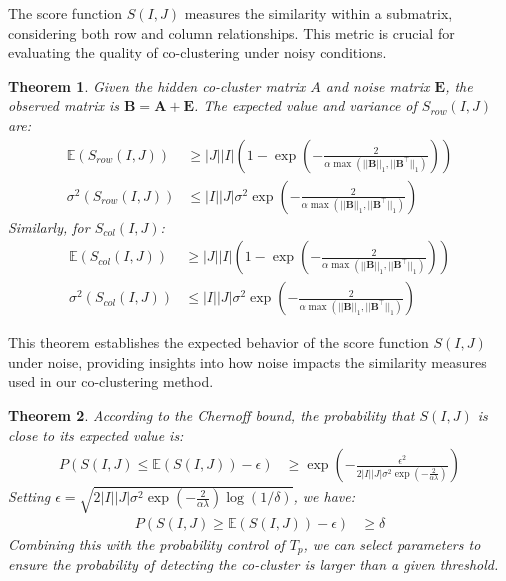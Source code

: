 \documentclass[journal]{IEEEtran}
\newtheorem{theorem}{Theorem}
\begin{document}
The score function $S(I,J)$ measures the similarity within a submatrix, considering both row and column relationships. This metric is crucial for evaluating the quality of co-clustering under noisy conditions.

\begin{theorem}
  \label{thm:expected_score}
  Given the hidden co-cluster matrix $A$ and noise matrix $\mathbf{E}$, the observed matrix is $\mathbf{B} = \mathbf{A} + \mathbf{E}$. The expected value and variance of $S_{row}(I,J)$ are:
  \begin{align*}
    \mathbb{E}(S_{row}(I,J)) & \ge |J||I| \left(1 - \exp(-\frac{2}{\alpha \max(||\mathbf{B}||_1, ||\mathbf{B}^\top||_1)}) \right) \\
    \sigma^2(S_{row}(I,J))   & \le |I||J| \sigma^2 \exp(-\frac{2}{\alpha \max(||\mathbf{B}||_1, ||\mathbf{B}^\top||_1)})
  \end{align*}
  Similarly, for $S_{col}(I,J)$:
  \begin{align*}
    \mathbb{E}(S_{col}(I,J)) & \ge |J||I| \left(1 - \exp(-\frac{2}{\alpha \max(||\mathbf{B}||_1, ||\mathbf{B}^\top||_1)}) \right) \\
    \sigma^2(S_{col}(I,J))   & \le |I||J| \sigma^2 \exp(-\frac{2}{\alpha \max(||\mathbf{B}||_1, ||\mathbf{B}^\top||_1)})
  \end{align*}
\end{theorem}

This theorem establishes the expected behavior of the score function $S(I,J)$ under noise, providing insights into how noise impacts the similarity measures used in our co-clustering method.

\begin{theorem}
  \label{thm:chernoff_bound}
  According to the Chernoff bound, the probability that $S(I,J)$ is close to its expected value is:
  \begin{align*}
    P(S(I,J) \le \mathbb{E}(S(I,J)) - \epsilon)
     & \ge \exp(-\frac{\epsilon^2}{2|I||J| \sigma^2 \exp(-\frac{2}{\alpha \lambda})})
  \end{align*}
  Setting $\epsilon = \sqrt{2|I||J| \sigma^2 \exp(-\frac{2}{\alpha \lambda}) \log(1/\delta)}$, we have:
  \begin{align*}
    P(S(I,J) \ge \mathbb{E}(S(I,J)) - \epsilon) & \ge \delta
  \end{align*}
  Combining this with the probability control of $T_p$, we can select parameters to ensure the probability of detecting the co-cluster is larger than a given threshold.
\end{theorem}
\end{document}
